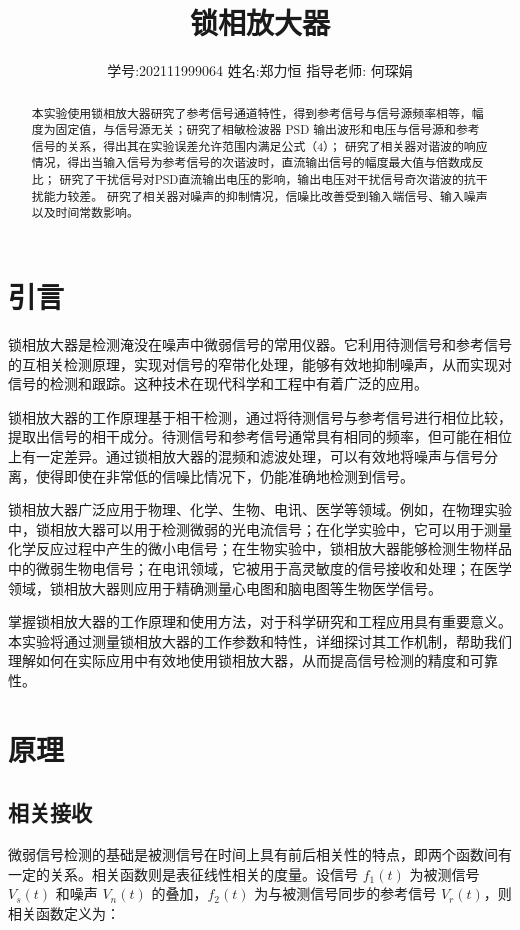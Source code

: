 \documentclass[12pt,a4paper]{article}
\title{\vspace{-4cm}\Large 锁相放大器}  %
\author{\kaishu 学号:202111999064 \hspace{1.5cm} 姓名:郑力恒 \hspace{1.5cm} 指导老师: 何琛娟}   %
\date{}
\begin{document}
\maketitle

\begin{abstract}
    本实验使用锁相放大器研究了参考信号通道特性，得到参考信号与信号源频率相等，幅度为固定值，与信号源无关；研究了相敏检波器 PSD 输出波形和电压与信号源和参考信号的关系，得出其在实验误差允许范围内满足公式（4）；
    研究了相关器对谐波的响应情况，得出当输入信号为参考信号的次谐波时，直流输出信号的幅度最大值与倍数成反比；
    研究了干扰信号对PSD直流输出电压的影响，输出电压对干扰信号奇次谐波的抗干扰能力较差。
    研究了相关器对噪声的抑制情况，信噪比改善受到输入端信号、输入噪声以及时间常数影响。
\end{abstract}

\section{引言}

锁相放大器是检测淹没在噪声中微弱信号的常用仪器。它利用待测信号和参考信号的互相关检测原理，实现对信号的窄带化处理，能够有效地抑制噪声，从而实现对信号的检测和跟踪。这种技术在现代科学和工程中有着广泛的应用。

锁相放大器的工作原理基于相干检测，通过将待测信号与参考信号进行相位比较，提取出信号的相干成分。待测信号和参考信号通常具有相同的频率，但可能在相位上有一定差异。通过锁相放大器的混频和滤波处理，可以有效地将噪声与信号分离，使得即使在非常低的信噪比情况下，仍能准确地检测到信号。

锁相放大器广泛应用于物理、化学、生物、电讯、医学等领域。例如，在物理实验中，锁相放大器可以用于检测微弱的光电流信号；在化学实验中，它可以用于测量化学反应过程中产生的微小电信号；在生物实验中，锁相放大器能够检测生物样品中的微弱生物电信号；在电讯领域，它被用于高灵敏度的信号接收和处理；在医学领域，锁相放大器则应用于精确测量心电图和脑电图等生物医学信号。

掌握锁相放大器的工作原理和使用方法，对于科学研究和工程应用具有重要意义。本实验将通过测量锁相放大器的工作参数和特性，详细探讨其工作机制，帮助我们理解如何在实际应用中有效地使用锁相放大器，从而提高信号检测的精度和可靠性。

\section{原理}
\subsection{相关接收}
微弱信号检测的基础是被测信号在时间上具有前后相关性的特点，即两个函数间有一定的关系。相关函数则是表征线性相关的度量。设信号 $f_1(t)$ 为被测信号 $V_s(t)$ 和噪声 $V_n(t)$ 的叠加，$f_2(t)$ 为与被测信号同步的参考信号 $V_r(t)$，则相关函数定义为：
\end{document}
